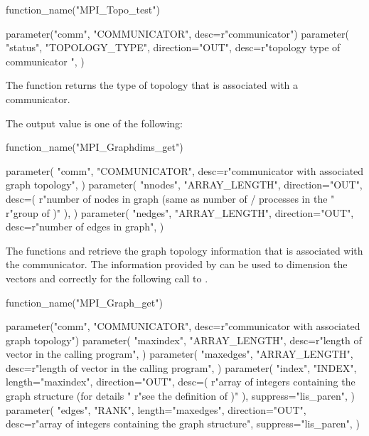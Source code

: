\begin{mpi-binding}
    function_name("MPI_Topo_test")
    
    parameter("comm", "COMMUNICATOR", desc=r"communicator")
    parameter(
        "status",
        "TOPOLOGY_TYPE",
        direction="OUT",
        desc=r"topology type of communicator ",
    )
\end{mpi-binding}

The function  returns the type of topology that
is associated with a communicator.

The output value  is one of the following:
\begin{constlist}
\end{constlist}

\begin{mpi-binding}
    function_name("MPI_Graphdims_get")
    
    parameter(
        "comm",
        "COMMUNICATOR",
        desc=r"communicator with associated graph topology",
    )
    parameter(
        "nnodes",
        "ARRAY_LENGTH",
        direction="OUT",
        desc=(
            r"number of nodes in graph (same as number of \MPI/ processes in the "
            r"group of )"
        ),
    )
    parameter(
        "nedges",
        "ARRAY_LENGTH",
        direction="OUT",
        desc=r"number of edges in graph",
    )
\end{mpi-binding}
\begin{sloppy}
The functions  and
 retrieve the graph \mbox{topology} information
that is associated with the communicator.
The information provided by  can be used
to dimension the
vectors  and  correctly for the following call
to .
\end{sloppy}

\begin{mpi-binding}
    function_name("MPI_Graph_get")

    parameter("comm", "COMMUNICATOR", desc=r"communicator with associated graph topology")
    parameter(
        "maxindex",
        "ARRAY_LENGTH",
        desc=r"length of vector  in the calling program",
    )
    parameter(
        "maxedges",
        "ARRAY_LENGTH",
        desc=r"length of vector  in the calling program",
    )
    parameter(
        "index",
        "INDEX",
        length="maxindex",
        direction="OUT",
        desc=(
            r"array of integers containing the graph structure (for details "
            r"see the definition of )"
        ),
        suppress="lis_paren",
    )
    parameter(
        "edges",
        "RANK",
        length="maxedges",
        direction="OUT",
        desc=r"array of integers containing the graph structure",
        suppress="lis_paren",
    )
\end{mpi-binding}


